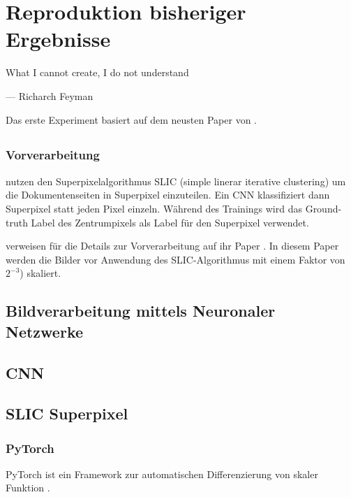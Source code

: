 \chapter{Reproduktion bisheriger Ergebnisse}
\label{chap:reproduktion}
\epigraph{What I cannot create, I do not understand}{--- Richarch Feyman}


Das erste Experiment basiert auf dem neusten Paper von \citeauthor{ChenConvolutionalNeuralNetworks2017}. 

\section{\textcite{ChenConvolutionalNeuralNetworks2017}}

\subsection{Vorverarbeitung}
\citeauthor{ChenConvolutionalNeuralNetworks2017} nutzen den Superpixelalgorithmus SLIC (simple linerar iterative clustering)
\cite{AchantaSLICSuperpixels2010} um die Dokumentenseiten in Superpixel einzuteilen.
Ein CNN klassifiziert dann Superpixel statt jeden Pixel einzeln.
Während des Trainings wird das Ground-truth Label des Zentrumpixels als Label für den Superpixel verwendet.

\citeauthor{ChenConvolutionalNeuralNetworks2017} verweisen für die Details zur Vorverarbeitung 
auf ihr Paper \cite{ChenPageSegmentationHistorical2016}. 
In diesem Paper werden die Bilder vor Anwendung des SLIC-Algorithmus mit einem Faktor von \(2^{-3}\)) skaliert.



\section{Bildverarbeitung mittels Neuronaler Netzwerke}
\section{CNN}
\section{SLIC Superpixel}
\cite{AchantaSLICSuperpixels2010}


\subsection{PyTorch}
PyTorch ist ein Framework zur automatischen Differenzierung von skaler Funktion \autocite{PaszkeAutomaticdifferentiationPyTorch2017}.

